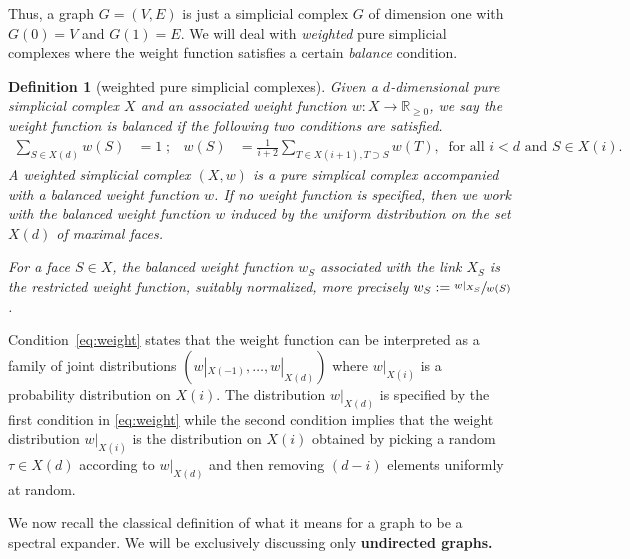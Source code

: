 \documentclass[11pt]{article}
\newtheorem{definition}[theorem]{Definition}
\newcommand{\R}{{\mathbb R}}
\begin{document}
Thus, a graph $G=(V,E)$ is just a simplicial complex $G$ of dimension one
with $G(0) = V$ and $G(1)=E$. We will deal with \emph{weighted} pure
simplicial complexes where the weight function satisfies a certain
\emph{balance} condition.

\begin{definition}[weighted pure simplicial complexes]
Given a $d$-dimensional pure simplicial complex $X$ and an associated
weight function $w\colon X \to \R_{\geq 0}$, we say the weight
function is \emph{balanced} if the following two conditions are
satisfied.
\begin{align}\label{eq:weight}
  \sum_{S \in X(d)} w(S) & = 1 \; ; & 
  w(S) &  = \frac{1}{i+2}\sum_{T \in X(i+1), T \supset S}
              w(T), \ \text{ for all } i<d \text{ and } S \in X(i).
\end{align}
%
%
%
%
A \emph{weighted simplicial complex} $(X,w)$ is a pure simplical
      complex accompanied with a balanced weight function $w$. If no
      weight function is specified, then we work with the balanced weight
      function $w$ induced by the uniform distribution on the set
      $X(d)$ of maximal faces.

      For a face $S \in X$, the balanced weight function $w_S$ associated
      with the link $X_S$ is the restricted weight function, suitably
      normalized, more precisely $w_S :=
    \sfrac{w|_{X_S}}{w(S)}$. 
\end{definition}

Condition~\eqref{eq:weight} states that the weight function can be interpreted as a family of joint distributions $(w|_{X(-1)}, \ldots, w|_{X(d)})$ where $w|_{X(i)}$ is a probability distribution on $X(i)$.
The distribution $w|_{X(d)}$ is specified by the first condition in \eqref{eq:weight} while the second condition implies that the weight distribution $w|_{X(i)}$ is the distribution on $X(i)$ obtained by picking a random $\tau \in X(d)$ according to $w|_{X(d)}$ and then removing $(d-i)$ elements uniformly at random.


We now recall the classical definition
of what it means for a graph to be a spectral expander.
We will be exclusively discussing only \textbf{undirected graphs.}
%
%
%

%
%
\end{document}
